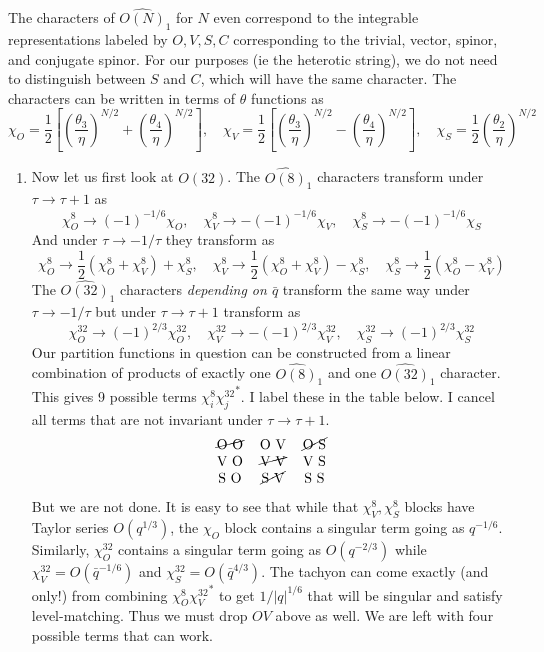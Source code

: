\documentclass[11pt, class=article, crop=false]{standalone}
\begin{document}
\begin{enumerate}
	The characters of $\widehat{O(N)}_1$ for $N$ even correspond to the integrable representations labeled by $O, V, S, C$ corresponding to the trivial, vector, spinor, and conjugate spinor. For our purposes (ie the heterotic string), we do not need to distinguish between $S$ and $C$, which will have the same character. The characters can be written in terms of $\theta$ functions as
	\[
		\chi_O = \frac12 \left[\left(\frac{\theta_3}{\eta}\right)^{N/2} + \left(\frac{\theta_4}{\eta}\right)^{N/2} \right], \quad
		\chi_V = \frac12 \left[\left(\frac{\theta_3}{\eta}\right)^{N/2} - \left(\frac{\theta_4}{\eta}\right)^{N/2} \right], \quad
		\chi_S = \frac12 \left(\frac{\theta_2}{\eta}\right)^{N/2}
	\]
	\begin{enumerate}
		\item Now let us first look at $O(32)$. 
	The $\widehat{O(8)}_1$ characters transform under $\tau \to \tau+1$ as 
	\[
		\chi_O^8 \to (-1)^{-1/6} \chi_O, \quad \chi_V^8 \to - (-1)^{-1/6} \chi_V, \quad \chi_S^8 \to - (-1)^{-1/6} \chi_S
	\]
	And under $\tau \to -1/\tau$ they transform as
	\[
			\chi_O^8 \to \frac12 (\chi_O^8 + \chi_V^8) + \chi_S^8, 
			\quad \chi_V^8 \to \frac12 (\chi_O^8 + \chi_V^8) - \chi_S^8,
			\quad \chi_S^8 \to \frac12 (\chi_O^8 - \chi_V^8)
	\]
	The $\widehat{O(32)}_1$ characters \emph{depending on $\bar q$} transform the same way under $\tau \to -1/\tau$ but under $\tau \to \tau + 1$ transform as
	\[
		\chi_O^{32} \to (-1)^{2/3} \chi_O^{32}, \quad \chi_V^{32} \to - (-1)^{2/3} \chi_V^{32}, \quad \chi_S^{32} \to (-1)^{2/3} \chi_S^{32}
	\]
	Our partition functions in question can be constructed from a linear combination of products of exactly one $\widehat{O(8)}_1$ and one $\widehat{O(32)}_1$ character. This gives 9 possible terms $\chi_i^8 {\chi^{32}_j}^*$. I label these in the table below. I cancel all terms that are not invariant under $\tau \to \tau + 1$. 
	\[
		\begin{tabular}{c c c}
			\cancel{O O} & O V & \cancel{O S}\\
			V O & \cancel{V V} & V S\\
			S O & \cancel{S V} & S S
		\end{tabular}
	\]
	But we are not done. It is easy to see that while that $\chi_V^8, \chi_S^8$ blocks have Taylor series $O(q^{1/3})$, the $\chi_O$ block contains a singular term going as $q^{-1/6}$. Similarly, $\chi_O^{32}$ contains a singular term going as $O(q^{-2/3})$ while $\chi_V^{32} = O(\bar q^{-1/6})$ and $\chi_{S}^{32} = O(\bar q^{4/3})$. The tachyon can come exactly (and only!) from combining $\chi_O^{8} {\chi_V^{32}}^*$ to get $1/|q|^{1/6}$ that will be singular and satisfy level-matching. Thus we must drop $O V$ above as well. We are left with four possible terms that can work. 
	

\end{enumerate}
\end{enumerate}
\end{document}
